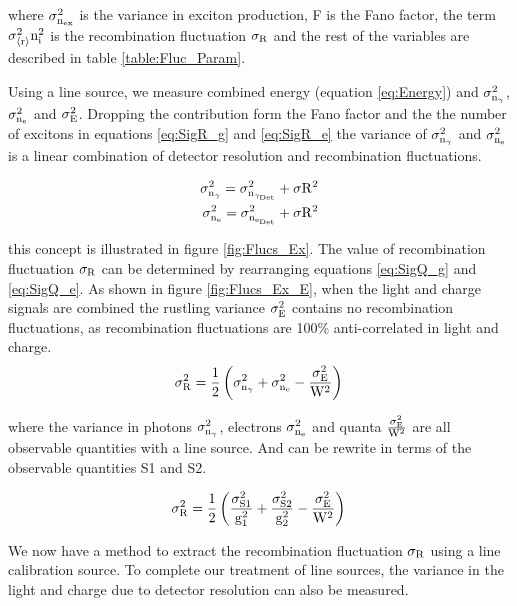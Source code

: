 \noindent where $\rm \sigma_{n_{ex}}^2$ is the variance in exciton production, F is the Fano factor, the term $\rm \sigma_{\left<r\right>}^2 n_i^2$ is the recombination fluctuation $\rm \sigma_R$ and the rest of the variables are described in table \ref{table:Fluc_Param}. 

Using a line source, we measure combined energy (equation \ref{eq:Energy}) and $\rm \sigma_{n_\gamma}^2$, $\rm \sigma_{n_e}^2$ and $\rm \sigma_{E}^2$. Dropping the contribution form the Fano factor and the the number of excitons in equations \ref{eq:SigR_g} and \ref{eq:SigR_e} the variance of $\rm \sigma_{n_\gamma}^2$ and $\rm \sigma_{n_e}^2$ is a linear combination of detector resolution and recombination fluctuations.

\begin{alignat}{2}
\label{eq:SigQ_g} \rm  \sigma_{n_{\gamma}}^2 = \sigma_{n_{\gamma_{Det}}}^2 + \sigma{R^2}\\
\label{eq:SigQ_e} \rm \sigma_{n_{e}}^2 = \sigma_{n_{e_{Det}}}^2 + \sigma{R^2}
\end{alignat}

\noindent this concept is illustrated in figure \ref{fig:Flucs_Ex}. The value of recombination fluctuation $\rm \sigma_R$ can be determined by rearranging equations \ref{eq:SigQ_g} and \ref{eq:SigQ_e}. As shown in figure \ref{fig:Flucs_Ex_E}, when the light and charge signals are combined the rustling variance $\rm \sigma_{E}^2$ contains no recombination fluctuations, as recombination fluctuations are 100\% anti-correlated in light and charge. 
\begin{equation}
\rm \sigma_{R}^2  = \frac{1}{2}\left(\sigma_{n_\gamma}^2 + \sigma_{n_e}^2 - \frac{\sigma_E^2}{W^2}\right)\\
\label{eq:Dahl}
\end{equation}

\noindent where the variance in photons $\rm \sigma_{n_\gamma}^2$, electrons $\rm  \sigma_{n_e}^2$  and quanta $\rm \frac{\sigma_E^2}{W^2}$ are all observable quantities with a line source. And can be rewrite in terms of the observable quantities S1 and S2.

\begin{equation}
\rm \sigma_{R}^2  = \frac{1}{2}\left( \frac{\sigma_{S1}^2}{g_1^2} + \frac{\sigma_{S2}^2}{g_2^2} - \frac{\sigma_E^2}{W^2}\right)\\
\label{eq:Dahl_2}
\end{equation}

\noindent We now have a method to extract the recombination fluctuation $\rm \sigma_R$ using a line calibration source. To complete our treatment of line sources, the variance in the light and charge due to detector resolution can also be measured.

